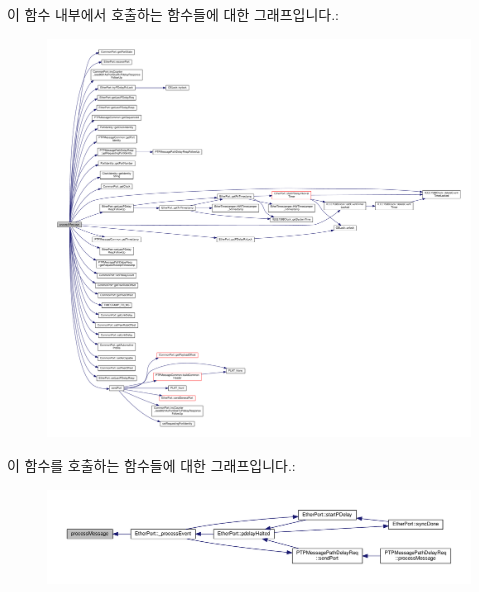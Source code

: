 이 함수 내부에서 호출하는 함수들에 대한 그래프입니다.\+:
\nopagebreak
\begin{figure}[H]
\begin{center}
\leavevmode
\includegraphics[width=350pt]{class_p_t_p_message_path_delay_resp_follow_up_a45670a42f5684252d52543f9ed3a1551_cgraph}
\end{center}
\end{figure}




이 함수를 호출하는 함수들에 대한 그래프입니다.\+:
\nopagebreak
\begin{figure}[H]
\begin{center}
\leavevmode
\includegraphics[width=350pt]{class_p_t_p_message_path_delay_resp_follow_up_a45670a42f5684252d52543f9ed3a1551_icgraph}
\end{center}
\end{figure}


